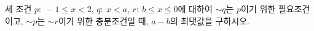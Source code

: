 세 조건 $p:\ -1\le x<2$, $q:\ x<a$, $r:\ b\le x\le 0$에 대하여 $\sim q$는 $p$이기 위한 필요조건이고, $\sim p$는 $\sim r$이기 위한 충분조건일 때, $a-b$의 최댓값을 구하시오. 
